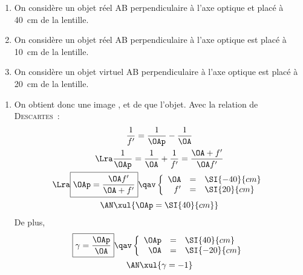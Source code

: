 \documentclass[a4paper, 10pt, garamond, oneside]{book}
\begin{document}
{	\begin{enumerate}
		\item On considère un objet réel AB perpendiculaire à l'axe optique et placé
		      à \SI{40}{cm} de la lentille.
		\item On considère un objet réel AB perpendiculaire à l'axe optique est
		      placé à \SI{10}{cm} de la lentille.
		\item On considère un objet virtuel AB perpendiculaire à l'axe optique est
		      placé à \SI{20}{cm} de la lentille.
	\end{enumerate}
}{
	\begin{enumerate}
		\item
		      \noindent
		      \begin{minipage}[t]{.48\linewidth}
			      On obtient donc une image ,  et de
			       que l'objet. Avec la relation de
			      \textsc{Descartes}~:
			      \begin{gather*}
				      \frac{1}{f'} =  \frac{1}{\OAp}-\frac{1}{\OA}
				      \\\Lra
				      \frac{1}{\OAp} = \frac{1}{\OA}+\frac{1}{f'}= \frac{\OA+f'}{\OA f'}
				      \\\Lra
				      \boxed{\OAp = \frac{\OA f'}{\OA+f'}}
				      \qav
				      \left\{
				      \begin{array}{rcl}
					      \OA & = & \SI{-40}{cm}
					      \\
					      f'  & = & \SI{20}{cm}
				      \end{array}
				      \right.\\
				      \AN
				      \xul{
					      \OAp = \SI{40}{cm}
				      }
			      \end{gather*}
			      De plus,
			      \begin{gather*}
				      \boxed{\gamma = \frac{\OAp}{\OA}}
				      \qav
				      \left\{
				      \begin{array}{rcl}
					      \OAp & = & \SI{40}{cm}
					      \\
					      \OA  & = & \SI{-20}{cm}
				      \end{array}
				      \right.\\
				      \AN
				      \xul{
					      \gamma = -1
				      }
			      \end{gather*}
		      \end{minipage}
		      \hfill
		      \begin{minipage}[t]{.48\linewidth}
			      ~
			      \begin{center}

\end{center}
\end{minipage}
\end{enumerate}}
\end{document}
